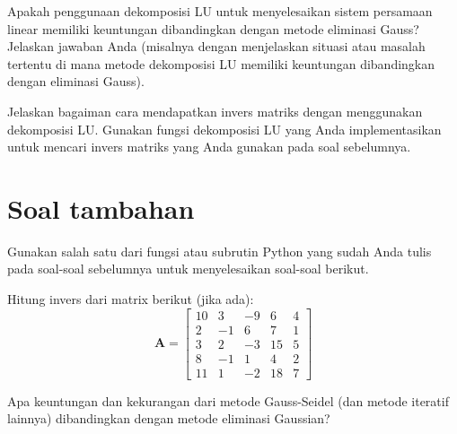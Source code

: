 \begin{soal}
Apakah penggunaan dekomposisi LU untuk menyelesaikan sistem persamaan linear memiliki keuntungan
dibandingkan dengan metode eliminasi Gauss? Jelaskan jawaban Anda (misalnya dengan menjelaskan
situasi atau masalah tertentu di mana metode dekomposisi LU memiliki keuntungan dibandingkan
dengan eliminasi Gauss).
\end{soal}

\begin{soal}
Jelaskan bagaiman cara mendapatkan invers matriks dengan menggunakan
dekomposisi LU. Gunakan fungsi dekomposisi LU yang Anda implementasikan
untuk mencari invers matriks yang Anda gunakan pada soal sebelumnya.
\end{soal}



\section{Soal tambahan}

Gunakan salah satu dari fungsi atau subrutin Python yang sudah Anda tulis
pada soal-soal sebelumnya untuk menyelesaikan soal-soal berikut.

\begin{soal}
Hitung invers dari matrix berikut (jika ada):
\begin{equation*}
\mathbf{A} = \begin{bmatrix}
10 & 3 & -9 & 6 & 4 \\
2 & -1 & 6 & 7 & 1 \\
3 & 2 & -3 & 15 & 5 \\
8 & -1 & 1 & 4 & 2 \\
11 & 1 & -2 & 18 & 7
\end{bmatrix}
\end{equation*}
\end{soal}











\begin{soal}
Apa keuntungan dan kekurangan dari metode Gauss-Seidel (dan metode iteratif lainnya)
dibandingkan dengan metode eliminasi Gaussian?
\end{soal}


